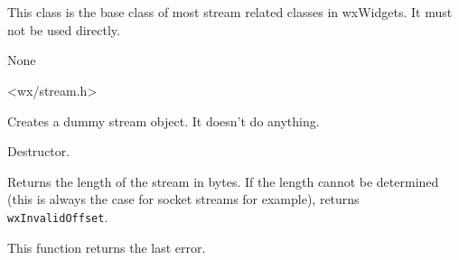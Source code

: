 \section{}\label{wxstreambase}

This class is the base class of most stream related classes in wxWidgets. It must
not be used directly.


None


<wx/stream.h>






\label{wxstreambasector}


Creates a dummy stream object. It doesn't do anything.


\label{wxstreambasedtor}


Destructor.


\label{wxstreambasegetlength}


Returns the length of the stream in bytes. If the length cannot be determined
(this is always the case for socket streams for example), returns
\texttt{wxInvalidOffset}.



\label{wxstreambasegetlasterror}


This function returns the last error.

\twocolwidtha{5cm}
\begin{twocollist}\itemsep=0pt
\end{twocollist}


